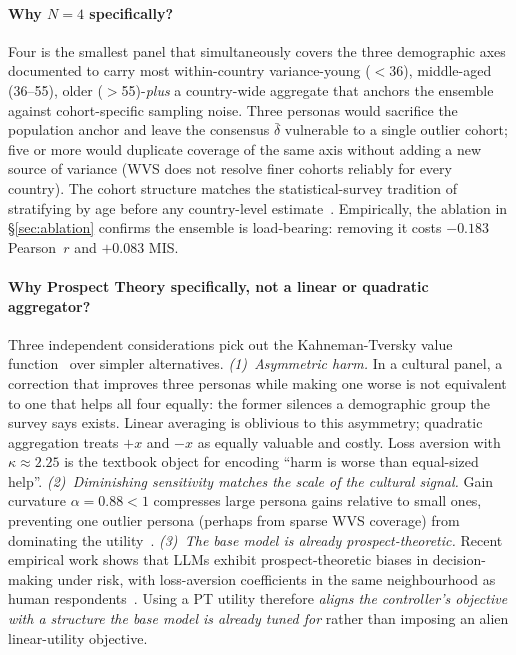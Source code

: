 \documentclass{article}
\begin{document}
\paragraph{Why $N{=}4$ specifically?}
Four is the smallest panel that simultaneously covers the three demographic
axes documented to carry most within-country variance-young ($<$36),
middle-aged (36--55), older ($>$55)-\emph{plus} a country-wide aggregate
that anchors the ensemble against cohort-specific sampling noise. Three
personas would sacrifice the population anchor and leave the consensus
$\bar\delta$ vulnerable to a single outlier cohort; five or more would
duplicate coverage of the same axis without adding a new source of variance
(WVS does not resolve finer cohorts reliably for every country). The cohort
structure matches the statistical-survey tradition of stratifying by age
before any country-level estimate~\citep{kish1965survey}. Empirically, the
ablation in \S\ref{sec:ablation} confirms the ensemble is load-bearing:
removing it costs $-0.183$ Pearson~$r$ and $+0.083$ MIS\@.

\paragraph{Why Prospect Theory specifically, not a linear or quadratic
aggregator?}
Three independent considerations pick out the Kahneman-Tversky value
function~\citep{kahneman1979prospect, tversky1992advances} over simpler
alternatives.
\emph{(1)~Asymmetric harm.} In a cultural panel, a correction that improves
three personas while making one worse is not equivalent to one that helps all
four equally: the former silences a demographic group the survey says exists.
Linear averaging is oblivious to this asymmetry; quadratic aggregation treats
$+x$ and $-x$ as equally valuable and costly. Loss aversion with
$\kappa{\approx}2.25$ is the textbook object for encoding ``harm is worse than
equal-sized help''.
\emph{(2)~Diminishing sensitivity matches the scale of the cultural signal.}
Gain curvature $\alpha{=}0.88{<}1$ compresses large persona gains relative to
small ones, preventing one outlier persona (perhaps from sparse WVS coverage)
from dominating the utility~\citep{tversky1992advances}.
\emph{(3)~The base model is already prospect-theoretic.} Recent empirical
work shows that LLMs exhibit prospect-theoretic biases in decision-making
under risk, with loss-aversion coefficients in the same neighbourhood as human
respondents~\citep{payne2025prospect}. Using a PT utility therefore
\emph{aligns the controller's objective with a structure the base model is
already tuned for} rather than imposing an alien linear-utility objective.
\end{document}
